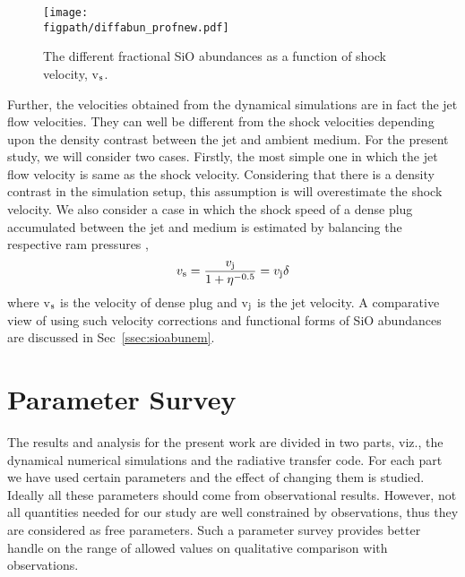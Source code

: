 \documentclass[useAMS,usenatbib]{mn2e}
\newcommand{\figpath}{/Users/bhargavvaidya/MyProject/work/Leeds_Uni/SiOJets_New/PAPER/PFIGS/}
\begin{document}
\begin{figure}
 \texttt{[image: \\figpath/diffabun\_profnew.pdf]}%
 \caption{The different fractional SiO abundances as a function of
   shock velocity, v$_{\rm s}$.}
 \label{abun}
\end{figure}

Further, the velocities obtained from the dynamical simulations are in fact the
jet flow velocities. They can well be different from the shock
velocities depending upon the density contrast between the jet and
ambient medium. For the present study, we will consider two
cases. Firstly, the most simple one in which the jet flow velocity is
same as the shock velocity. Considering that there is a density
contrast in the simulation setup, this assumption is will
overestimate the shock velocity. We also
consider a case in which the shock speed of a dense plug accumulated
between the jet and medium is estimated by balancing the respective ram
pressures \citep{Masson:1993p9661},
\begin{equation}
\label{eq:shockjetvel}
v_{\rm s} = \frac{v_{\rm j}}{1 + \eta^{-0.5}} = v_{\rm j}\delta
\end{equation}
where v$_{\rm s}$ is the velocity of dense plug and v$_{\rm j}$ is the
jet velocity. A comparative view of using such velocity corrections and
functional forms of SiO abundances are discussed in
Sec~\ref{ssec:sioabunem}.

    







\section{Parameter Survey}
\label{sec:parasurvey}
The results and analysis for the present work are divided in two parts,
viz., the dynamical numerical simulations and the
radiative transfer code. For each part we have used certain parameters
and the effect of changing them is studied. Ideally all these parameters should come from observational
results. However, not all quantities needed for our study are well
constrained by observations, thus they are considered as
free parameters. Such a parameter survey provides better handle on the range of allowed
values on qualitative comparison with observations. 
%
\end{document}
